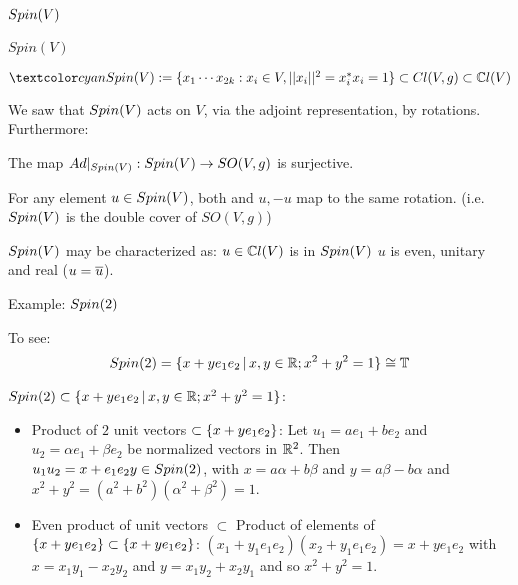 \subsection{$Spin(V)$}

\begin{frame}{$Spin(V)$} %

    \begin{Definition} $\defn{\spinv} := \set{x_1 \cdots x_{2k}: x_i \in V, ||x_i||^2 = x_i^* x_i = 1} \subset \clvg \subset \cclv$
    \end{Definition}
    
    We saw that $Spin(V)$ acts on $V$, via the adjoint representation, by rotations. Furthermore:
    
    \begin{proposition}
    The map $Ad|_{Spin(V)}: Spin(V) \to SO(V, g)$ is surjective.
    
    For any element $u \in Spin(V)$, both and $u, -u$ map to the same rotation. (i.e. $Spin(V)$ is the double cover of $SO(V, g)$)
    \end{proposition}
    
    $Spin(V)$ may be characterized as: $u \in \mathbb C l(V)$ is in $Spin(V)$ \iff $u$ is even, unitary and real ($u = \overline{u}$).
\end{frame}

\begin{frame}{Example: $Spin(2)$} %
    
    To see: \[Spin(2) = \{x + y e_1 e_2 \,|\, x, y \in \mathbb R;  x^2 + y^2 = 1\} \cong \mathbb T\]
    
    $Spin(2) \subset \{x + y e_1 e_2 \,|\, x, y \in \mathbb R;  x^2 + y^2 = 1\}$:
        \begin{itemize}
            
        \item Product of $2$ unit vectors $\subset \{x + y e_1 e_2\}$: Let $u_1 = a e_1 + b e_2$ and $u_2 = \alpha e_1 + \beta e_2$ be normalized vectors in $\mathbb R^2$. Then $u_1 u_2 = x + e_1 e_2 y \in Spin(2)$, with $x = a \alpha + b \beta$ and $y = a \beta  - b \alpha$ and $x^2 + y^2 = (a^2 + b^2)(\alpha^2 + \beta^2) = 1$.
        
        \item Even product of unit vectors $\subset$ Product of elements of $\{x + y e_1 e_2\} \subset \{x + y e_1 e_2\}$: $(x_1 + y_1 e_1 e_2)(x_2 + y_1 e_1 e_2) = x + y e_1 e_2$ with $x = x_1 y_1 - x_2 y_2$ and $y = x_1 y_2 + x_2 y_1$ and so $x^2 + y^2 = 1$.
            
        \end{itemize}
    
\end{frame}

